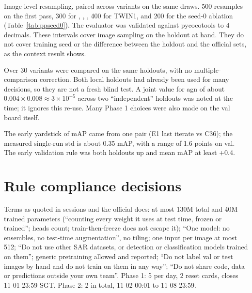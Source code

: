 Image-level resampling, paired across variants on the same draws. 500 resamples on the first pass, 300 for , , , 400 for TWIN1, and 200 for the seed-0 ablation (Table~\ref{tab:ppseed0}). The evaluator was validated against pycocotools to 4 decimals. These intervals cover image sampling on the holdout at hand. They do not cover training seed or the difference between the holdout and the official sets, as the context result shows.

Over 30 variants were compared on the same holdouts, with no multiple-comparison correction. Both local holdouts had already been used for many decisions, so they are not a fresh blind test. A joint value for agn of about $0.004\times0.008\approx3\times10^{-5}$ across two ``independent'' holdouts was noted at the time\sn{}; it ignores this re-use. Many Phase 1 choices were also made on the val board itself.

The early yardstick of  mAP came from one pair (E1 last iterate vs C36); the measured single-run std is about 0.35 mAP, with a range of 1.6 points on val. The early validation rule was both holdouts up and mean mAP at least +0.4.

\section{Rule compliance decisions}
\label{sec:rules}

Terms as quoted in sessions and the official docs: at most 130M total and 40M trained parameters (``counting every weight it uses at test time, frozen or trained''; heads count; train-then-freeze does not escape it); ``One model: no ensembles, no test-time augmentation'', no tiling; one input per image at most 512; ``Do not use other SAR datasets, or detection or classification models trained on them''; generic pretraining allowed and reported; ``Do not label val or test images by hand and do not train on them in any way''; ``Do not share code, data or predictions outside your own team''. Phase 1: 5 per day, 2 reset cards, closes 11-01 23:59 SGT. Phase 2: 2 in total, 11-02 00:01 to 11-08 23:59.

